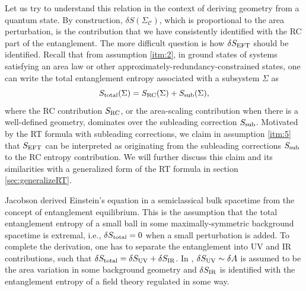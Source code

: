 \documentclass[%
preprint,
nofootinbib,
amsmath,amssymb,
aps,
prd,
showpacs,
superscriptaddress
]{revtex4-1}
\newcommand{\region}{\Sigma}
\begin{document}
Let us try to understand this relation in the context of deriving geometry from a quantum state. By construction, $\delta S({\region}_{\mathcal{C}})$, which is proportional to the area perturbation, is the contribution that we have consistently identified with the RC part of the entanglement. 
The more difficult question is how $\delta S_{\rm EFT}$ should be identified.
Recall that from assumption \ref{itm:2}, in ground states of systems satisfying an area law \cite{AreaLawEntRev} or other approximately-redundancy-constrained states, one can write the total entanglement entropy associated with a subsystem ${\region}$ as 
\begin{equation}
S_{\rm total}({\region}) = S_{\rm RC}({\region}) + S_{\rm sub}({\region}),
\label{eqn:entropysum}
\end{equation}
where the RC contribution $S_{\rm RC}$, or the area-scaling contribution when there is a well-defined geometry, dominates over the subleading correction $S_{\rm sub}$. 
 Motivated by the RT formula with subleading corrections, we claim in assumption \ref{itm:5} that $S_{\rm EFT}$ can be interpreted as originating from the subleading corrections $S_{\rm sub}$ to the RC entropy contribution. We will further discuss this claim and its similarities with a generalized form of the RT formula in section \ref{sec:generalizeRT}.

Jacobson \cite{Jacobson:2015hqa} derived Einstein's equation in a semiclassical bulk spacetime from the concept of entanglement equilibrium. This is the assumption that the total entanglement entropy of a small ball in some maximally-symmetric background spacetime is extremal, i.e., $\delta S_{\rm total} =0$ when a small perturbation is added. To complete the derivation, one has to separate the entanglement into UV and IR contributions, such that $\delta S_{\rm total}= \delta S_{\rm UV}+ \delta S_{\rm IR}$. In  \cite{Jacobson:2015hqa}, $\delta S_{\rm UV}\sim \delta A$ is assumed to be the area variation in some background geometry and $\delta S_{\rm IR}$ is identified with the entanglement entropy of a field theory regulated in some way.
\end{document}
